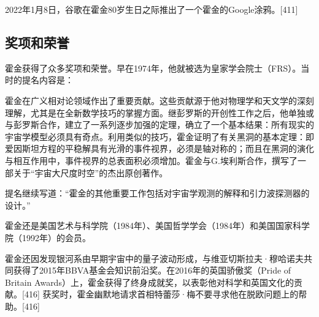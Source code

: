 2022年1月8日，谷歌在霍金80岁生日之际推出了一个霍金的Google涂鸦。[411]
\subsection{奖项和荣誉}
霍金获得了众多奖项和荣誉。早在1974年，他就被选为皇家学会院士（FRS）。当时的提名内容是：

霍金在广义相对论领域作出了重要贡献。这些贡献源于他对物理学和天文学的深刻理解，尤其是在全新数学技巧的掌握方面。继彭罗斯的开创性工作之后，他单独或与彭罗斯合作，建立了一系列逐步加强的定理，确立了一个基本结果：所有现实的宇宙学模型必须具有奇点。利用类似的技巧，霍金证明了有关黑洞的基本定理：即爱因斯坦方程的平稳解具有光滑的事件视界，必须是轴对称的；而且在黑洞的演化与相互作用中，事件视界的总表面积必须增加。霍金与G.埃利斯合作，撰写了一部关于“宇宙大尺度时空”的杰出原创著作。

提名继续写道：“霍金的其他重要工作包括对宇宙学观测的解释和引力波探测器的设计。”

霍金还是美国艺术与科学院（1984年）、美国哲学学会（1984年）和美国国家科学院（1992年）的会员。

霍金还因发现银河系由早期宇宙中的量子波动形成，与维亚切斯拉夫·穆哈诺夫共同获得了2015年BBVA基金会知识前沿奖。在2016年的英国骄傲奖（Pride of Britain Awards）上，霍金获得了终身成就奖，以表彰他对科学和英国文化的贡献。[416] 获奖时，霍金幽默地请求首相特蕾莎·梅不要寻求他在脱欧问题上的帮助。[416]